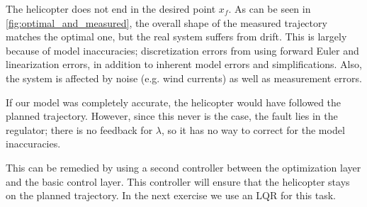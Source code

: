 

The helicopter does not end in the desired point $x_f$. As can be seen in \cref{fig:optimal_and_measured}, the overall shape of the measured trajectory matches the optimal one, but the real system suffers from drift. This is largely because of model inaccuracies; discretization errors from using forward Euler and linearization errors, in addition to inherent model errors and simplifications. Also, the system is affected by noise (e.g. wind currents) as well as measurement errors.

If our model was completely accurate, the helicopter would have followed the planned trajectory. However, since this never is the case, the fault lies in the regulator; there is no feedback for $\lambda$, so it has no way to correct for the model inaccuracies.

This can be remedied by using a second controller between the optimization layer and the basic control layer. This controller will ensure that the helicopter stays on the planned trajectory. In the next exercise we use an LQR for this task.
